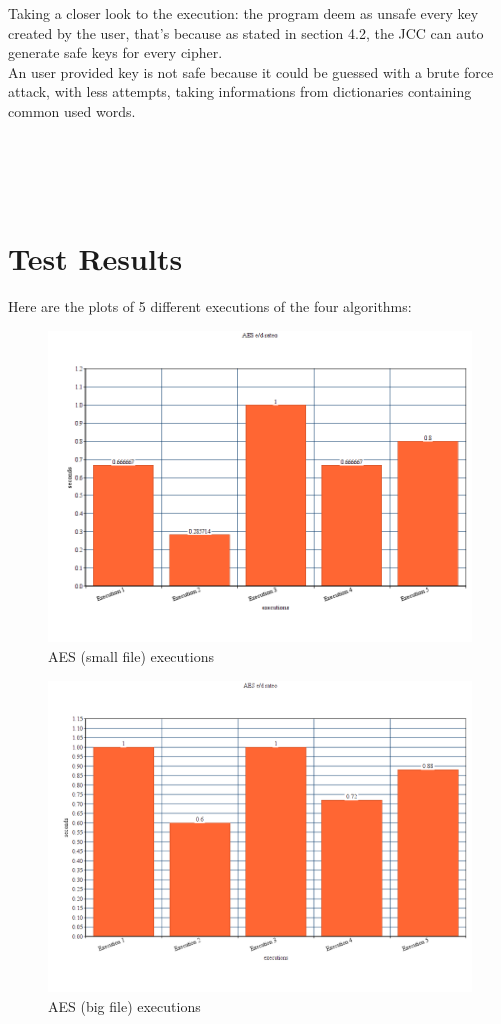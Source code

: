 \documentclass{article}
\begin{document}
	Taking a closer look to the execution: the program deem as unsafe every key created by the user, that's because as stated in section 4.2, the JCC can auto generate safe keys for every cipher.
\\An user provided key is not safe because it could be guessed with a brute force attack, with less attempts, taking informations from dictionaries containing common used words.\\\\\\\\\\

	\section{Test Results}\label{sec:trTest}
	
	Here are the plots of 5 different executions of the four algorithms:
	
	\begin{figure}[h]
		\includegraphics[width=1\textwidth ]{images/AES_ed.png}
		\centering
		\caption{AES (small file) executions}
	\end{figure}
	
	\begin{figure}[h]
		\includegraphics[width=1\textwidth ]{images/AES(big).png}
		\centering
		\caption{AES (big file) executions}
	\end{figure}
	
\end{document}
